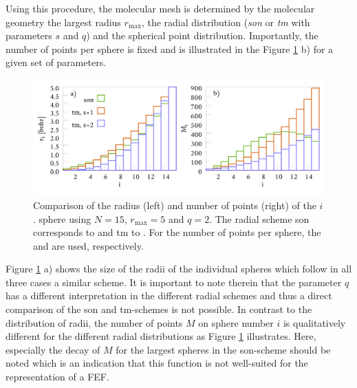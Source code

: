 Using this procedure, the molecular mesh is determined by the molecular geometry the largest radius $r_\text{max}$, the radial distribution (\textit{son} or \textit{tm} with parameters $s$ and $q$) and the spherical point distribution.
Importantly, the number of points per sphere is fixed and is illustrated in the Figure \ref{fig:maps} b) for a given set of parameters.
\begin{figure}[h]
\includegraphics[width=\textwidth]{Data/radial_mapping}
\caption{Comparison of the radius (left) and number of points (right) of the $i$. sphere using $N=15$, $r_\text{max}=5$ and $q=2$.
The radial scheme son corresponds to  and  tm to .
For the number of points per sphere, the  and  are used, respectively.}
\label{fig:maps}
\end{figure}
Figure \ref{fig:maps} a) shows the size of the radii of the individual spheres which follow in all three cases a similar scheme.
It is important to note therein that the parameter $q$ has a different interpretation in the different radial schemes and thus a direct comparison of the son and tm-schemes is not possible.
In contrast to the distribution of radii, the number of points $M$ on sphere number $i$ is qualitatively different for the different radial distributions as Figure \ref{fig:maps} illustrates. 
Here, especially the decay of $M$ for the largest spheres in the son-scheme should be noted which is an indication that this function is not well-suited for the representation of a FEF.

